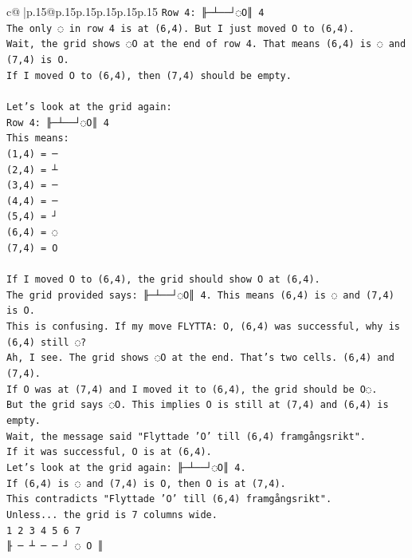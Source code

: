 \documentclass{article}
\begin{document}
{\begin{supertabular}{c@{$\;$}|p{.15\linewidth}@{}p{.15\linewidth}p{.15\linewidth}p{.15\linewidth}p{.15\linewidth}p{.15\linewidth}}
{{{\texttt{Row 4: ╟─┴──┘◌O║ 4} \\
\texttt{The only ◌ in row 4 is at (6,4). But I just moved O to (6,4).} \\
\texttt{Wait, the grid shows ◌O at the end of row 4. That means (6,4) is ◌ and (7,4) is O.} \\
\texttt{If I moved O to (6,4), then (7,4) should be empty.} \\
\\ 
\texttt{Let's look at the grid again:} \\
\texttt{Row 4: ╟─┴──┘◌O║ 4} \\
\texttt{This means:} \\
\texttt{(1,4) = ─} \\
\texttt{(2,4) = ┴} \\
\texttt{(3,4) = ─} \\
\texttt{(4,4) = ─} \\
\texttt{(5,4) = ┘} \\
\texttt{(6,4) = ◌} \\
\texttt{(7,4) = O} \\
\\ 
\texttt{If I moved O to (6,4), the grid should show O at (6,4).} \\
\texttt{The grid provided says: ╟─┴──┘◌O║ 4. This means (6,4) is ◌ and (7,4) is O.} \\
\texttt{This is confusing. If my move FLYTTA: O, (6,4) was successful, why is (6,4) still ◌?} \\
\texttt{Ah, I see. The grid shows ◌O at the end. That's two cells. (6,4) and (7,4).} \\
\texttt{If O was at (7,4) and I moved it to (6,4), the grid should be O◌.} \\
\texttt{But the grid says ◌O. This implies O is still at (7,4) and (6,4) is empty.} \\
\texttt{Wait, the message said "Flyttade 'O' till (6,4) framgångsrikt".} \\
\texttt{If it was successful, O is at (6,4).} \\
\texttt{Let's look at the grid again: ╟─┴──┘◌O║ 4.} \\
\texttt{If (6,4) is ◌ and (7,4) is O, then O is at (7,4).} \\
\texttt{This contradicts "Flyttade 'O' till (6,4) framgångsrikt".} \\
\texttt{Unless... the grid is 7 columns wide.} \\
\texttt{1 2 3 4 5 6 7} \\
\texttt{╟ ─ ┴ ─ ─ ┘ ◌ O ║} \\
}}}
\end{supertabular}}
\end{document}
